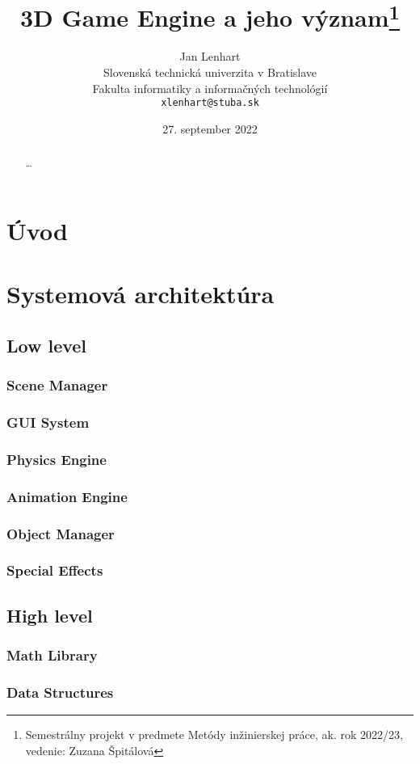 \documentclass[10pt,twoside,slovak,a4paper,hidelinks]{article}
\title{3D Game Engine a jeho význam\thanks{Semestrálny projekt v predmete Metódy inžinierskej práce, ak. rok 2022/23, vedenie: Zuzana Špitálová}} %
\author{Jan Lenhart\\[2pt]
	{\small Slovenská technická univerzita v Bratislave}\\
	{\small Fakulta informatiky a informačných technológií}\\
	{\small \texttt{xlenhart@stuba.sk}}
}
\date{\small 27. september 2022} %
\begin{document}
\maketitle

\begin{abstract}
\ldots
\end{abstract}



\section{Úvod}
\section{Systemová architektúra}\cite{Czarnecki:Staged}
\subsection{Low level}
\subsubsection{Scene Manager}
\subsubsection{GUI System}
\subsubsection{Physics Engine}
\subsubsection{Animation Engine}
\subsubsection{Object Manager}
\subsubsection{Special Effects}
\subsection{High level}
\subsubsection{Math Library}
\subsubsection{Data Structures}
\end{document}
